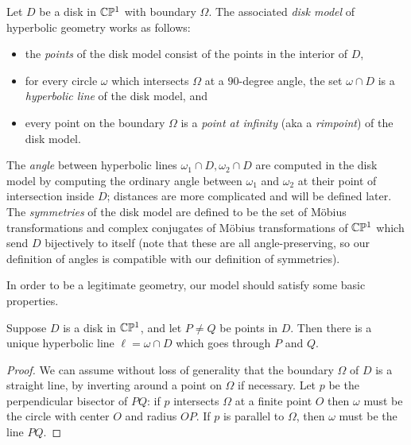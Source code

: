 \begin{defn} Let $D$ be a disk in $\mathbb{C}\mathbb{P}^1$ with boundary $\Omega$. The associated \emph{disk model} of hyperbolic geometry works as follows:
\begin{itemize}
\item the \emph{points} of the disk model consist of the points in the interior of $D$,
\item for every circle $\omega$ which intersects $\Omega$ at a $90$-degree angle, the set $\omega \cap D$ is a \emph{hyperbolic line} of the disk model, and
\item every point on the boundary $\Omega$ is a \emph{point at infinity} (aka a \emph{rimpoint}) of the disk model.
\end{itemize}
The \emph{angle} between hyperbolic lines $\omega_1\cap D, \omega_2\cap D$ are computed in the disk model by computing the ordinary angle between $\omega_1$ and $\omega_2$ at their point of intersection inside $D$; distances are more complicated and will be defined later. The \emph{symmetries} of the disk model are defined to be the set of M\"obius transformations and complex conjugates of M\"obius transformations of $\mathbb{C}\mathbb{P}^1$ which send $D$ bijectively to itself (note that these are all angle-preserving, so our definition of angles is compatible with our definition of symmetries).
\end{defn}

In order to be a legitimate geometry, our model should satisfy some basic properties.

\begin{prop}\label{hyperbolic-lines} Suppose $D$ is a disk in $\mathbb{C}\mathbb{P}^1$, and let $P \ne Q$ be points in $D$. Then there is a unique hyperbolic line $\ell = \omega \cap D$ which goes through $P$ and $Q$.
\end{prop}
\begin{proof} We can assume without loss of generality that the boundary $\Omega$ of $D$ is a straight line, by inverting around a point on $\Omega$ if necessary. Let $p$ be the perpendicular bisector of $PQ$: if $p$ intersects $\Omega$ at a finite point $O$ then $\omega$ must be the circle with center $O$ and radius $OP$. If $p$ is parallel to $\Omega$, then $\omega$ must be the line $PQ$.
\end{proof}

